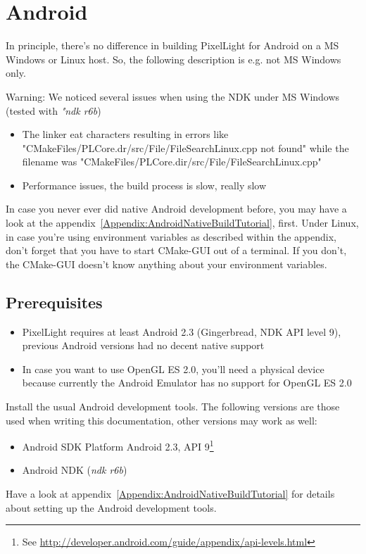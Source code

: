 \chapter{Android}
In principle, there's no difference in building PixelLight for Android on a \ac{MS} Windows or Linux host. So, the following description is e.g. not \ac{MS} Windows only.

Warning: We noticed several issues when using the \ac{NDK} under \ac{MS} Windows (tested with \emph{"ndk r6b})
\begin{itemize}
\item{The linker eat characters resulting in errors like "CMakeFiles/PLCore.dr/src/File/FileSearchLinux.cpp not found" while the filename was "CMakeFiles/PLCore.dir/src/File/FileSearchLinux.cpp"}
\item{Performance issues, the build process is slow, really slow}
\end{itemize}

In case you never ever did native Android development before, you may have a look at the appendix~\ref{Appendix:AndroidNativeBuildTutorial}, first. Under Linux, in case you're using environment variables as described within the appendix, don't forget that you have to start CMake-GUI out of a terminal. If you don't, the CMake-GUI doesn't know anything about your environment variables.




\section{Prerequisites}
\begin{itemize}
\item{PixelLight requires at least Android 2.3 (Gingerbread, \ac{NDK} \ac{API} level 9), previous Android versions had no decent native support}
\item{In case you want to use OpenGL ES 2.0, you'll need a physical device because currently the Android Emulator has no support for OpenGL ES 2.0}
\end{itemize}

Install the usual Android development tools. The following versions are those used when writing this documentation, other versions may work as well:
\begin{itemize}
\item{Android \ac{SDK} Platform Android 2.3, \ac{API} 9\footnote{See \url{http://developer.android.com/guide/appendix/api-levels.html}}}
\item{Android \ac{NDK} (\emph{ndk r6b})}
\end{itemize}
Have a look at appendix~\ref{Appendix:AndroidNativeBuildTutorial} for details about setting up the Android development tools.


